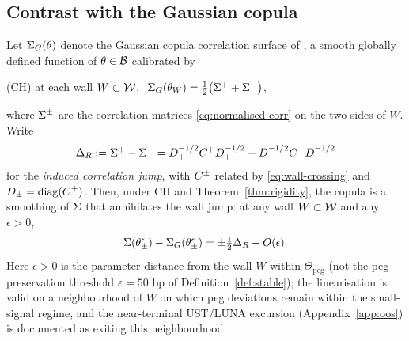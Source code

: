 \subsection{Contrast with the Gaussian copula}\label{sec:copula-fail}
\begin{corollary}\label{cor:copula-fail}
Let $\Sigma_G(\theta)$ denote the Gaussian copula correlation surface of \citet{Li2000}, a smooth globally defined function of $\theta \in \mathcal{B}$ calibrated by
\begin{center}
(CH) at each wall $W \subset \mathcal{W}$, $\ \Sigma_G(\theta_W) = \tfrac{1}{2}\big(\Sigma^+ + \Sigma^-\big)$,
\end{center}
where $\Sigma^\pm$ are the correlation matrices \eqref{eq:normalised-corr} on the two sides of $W$. Write
\begin{equation}\label{eq:corr-jump}
\Delta_R := \Sigma^+ - \Sigma^- = D_+^{-1/2}C^+ D_+^{-1/2} - D_-^{-1/2}C^- D_-^{-1/2}
\end{equation}
for the \emph{induced correlation jump}, with $C^\pm$ related by \eqref{eq:wall-crossing} and $D_\pm=\operatorname{diag}(C^\pm)$. Then, under CH and Theorem~\ref{thm:rigidity}, the copula is a smoothing of $\Sigma$ that annihilates the wall jump: at any wall $W \subset \mathcal{W}$ and any $\epsilon > 0$,
\begin{equation}\label{eq:copula-gap}
\Sigma(\theta^\epsilon_\pm) - \Sigma_G(\theta^\epsilon_\pm) = \pm\tfrac{1}{2}\Delta_R + O(\epsilon).
\end{equation}
Here $\epsilon > 0$ is the parameter distance from the wall $W$ within $\Theta_{\mathrm{peg}}$ (not the peg-preservation threshold $\varepsilon = 50$ bp of Definition~\ref{def:stable}); the linearisation is valid on a neighbourhood of $W$ on which peg deviations remain within the small-signal regime, and the near-terminal UST/LUNA excursion (Appendix~\ref{app:oos}) is documented as exiting this neighbourhood.
\end{corollary}

